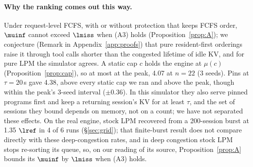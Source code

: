 \paragraph{Why the ranking comes out this way.} Under request-level FCFS, with or without protection that keeps FCFS order, $\muinf$ cannot exceed $\lmiss$ when (A3) holds (Proposition~\ref{prop:A}); we conjecture (Remark in Appendix~\ref{app:proofs}) that pure resident-first orderings raise it through tool calls shorter than the congested lifetime of idle KV, and for pure LPM the simulator agrees. A static cap $c$ holds the engine at $\mu(c)$ (Proposition~\ref{prop:cap}), so at most at the peak, 4.07 at $n=22$ (3 seeds). Pins at $\tau=20$\,s gave 4.38, above every static cap we ran and above the peak, though within the peak's 3-seed interval ($\pm0.36$). In this simulator they also serve pinned programs first and keep a returning session's KV for at least $\tau$, and the set of sessions they bound depends on memory, not on a count; we have not separated these effects. On the real engine, stock LPM recovered from a 200-session burst at 1.35 $\lref$ in 4 of 6 runs (\S\ref{sec:grid}); that finite-burst result does not compare directly with these deep-congestion rates, and in deep congestion stock LPM stops re-sorting its queue, so, on our reading of its source, Proposition~\ref{prop:A} bounds its $\muinf$ by $\lmiss$ when (A3) holds.
